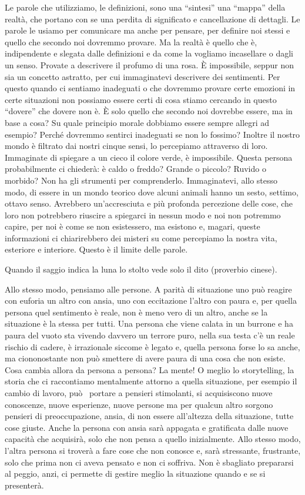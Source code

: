 \documentclass[12pt]{book} %
\begin{document}
Le parole che utilizziamo, le definizioni, sono una “sintesi” una “mappa” della realtà, che portano con se una perdita
di significato e cancellazione di dettagli. Le parole le usiamo per comunicare ma anche per pensare, per definire noi
stessi e quello che secondo noi dovremmo provare. Ma la realtà è quello che è, indipendente e slegata dalle definizioni
e da come la vogliamo incasellare o dagli un senso. Provate a descrivere il profumo di una rosa. È impossibile, seppur
non sia un concetto astratto, per cui immaginatevi descrivere dei sentimenti. Per questo quando ci sentiamo inadeguati
o che dovremmo provare certe emozioni in certe situazioni non possiamo essere certi di cosa stiamo cercando in questo
“dovere” che dovere non è. È solo quello che secondo noi dovrebbe essere, ma in base a cosa? Su quale principio morale
dobbiamo essere sempre allegri ad esempio? Perché dovremmo sentirci inadeguati se non lo fossimo? Inoltre il nostro
mondo è filtrato dai nostri cinque sensi, lo percepiamo attraverso di loro. Immaginate di spiegare a un cieco il colore
verde, è impossibile. Questa persona probabilmente ci chiederà: è caldo o freddo? Grande o piccolo? Ruvido o morbido?
Non ha gli strumenti per comprenderlo. Immaginatevi, allo stesso modo, di essere in un mondo teorico dove alcuni
animali hanno un sesto, settimo, ottavo senso. Avrebbero un'accresciuta e più profonda percezione
delle cose, che loro non potrebbero riuscire a spiegarci in nessun modo e noi non potremmo capire, per noi è come se
non esistessero, ma esistono e, magari, queste informazioni ci chiarirebbero dei misteri su come percepiamo la nostra
vita, esteriore e interiore. Questo è il limite delle parole. 

Quando il saggio indica la luna lo stolto vede solo il dito (proverbio cinese). 

Allo stesso modo, pensiamo alle persone. A parità di situazione uno può reagire con euforia un altro con ansia, uno con
eccitazione l'altro con paura e, per quella persona quel sentimento è reale, non è meno vero di un
altro, anche se la situazione è la stessa per tutti. Una persona che viene calata in un burrone e ha paura del vuoto
sta vivendo davvero un terrore puro, nella sua testa c'è un reale rischio di cadere, è irrazionale
siccome è legato e, quella persona forse lo sa anche, ma ciononostante non può smettere di avere paura di una cosa che
non esiste. Cosa cambia allora da persona a persona? La mente! O meglio lo storytelling, la storia che ci raccontiamo
mentalmente attorno a quella situazione, per esempio il cambio di lavoro, può \ portare a pensieri stimolanti, si
acquisiscono nuove conoscenze, nuove esperienze, nuove persone ma per qualcun altro sorgono pensieri di preoccupazione,
ansia, di non essere all'altezza della situazione, tutte cose giuste. Anche la persona con ansia
sarà appagata e gratificata dalle nuove capacità che acquisirà, solo che non pensa a quello inizialmente. Allo stesso
modo, l'altra persona si troverà a fare cose che non conosce e, sarà stressante, frustrante, solo
che prima non ci aveva pensato e non ci soffriva. Non è sbagliato prepararsi al peggio, anzi, ci permette di gestire
meglio la situazione quando e se si presenterà. 
\end{document}

